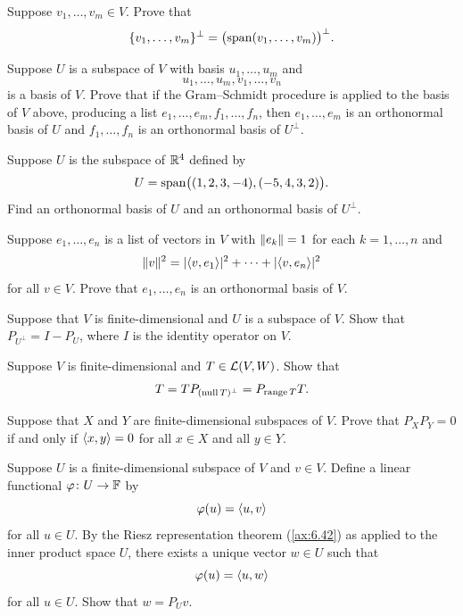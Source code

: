 \begin{exc}

\begin{exercise}
Suppose $v_1,\dots,v_m\in V$. Prove that
\[ \{v_1,\dots,v_m\}^\perp = \bigl(\operatorname{span}(v_1,\dots,v_m)\bigr)^\perp. \]
\end{exercise}

\begin{exercise}
Suppose $U$ is a subspace of $V$ with basis $u_1,\dots,u_m$ and
\[ u_1,\dots,u_m,v_1,\dots,v_n \]
is a basis of $V$. Prove that if the Gram--Schmidt procedure is applied to the
basis of $V$ above, producing a list $e_1,\dots,e_m,f_1,\dots,f_n$, then
$e_1,\dots,e_m$ is an orthonormal basis of $U$ and $f_1,\dots,f_n$ is an
orthonormal basis of $U^\perp$.
\end{exercise}

\begin{exercise}
Suppose $U$ is the subspace of $\mathbb{R}^4$ defined by
\[ U = \operatorname{span}\bigl((1,2,3,-4),(-5,4,3,2)\bigr). \]
Find an orthonormal basis of $U$ and an orthonormal basis of $U^\perp$.
\end{exercise}

\begin{exercise}
Suppose $e_1,\dots,e_n$ is a list of vectors in $V$ with $\lVert e_k \rVert=1$ for each
$k=1,\dots,n$ and
\[ \lVert v \rVert^2 = \lvert \langle v, e_1 \rangle \rvert^2+\cdots+\lvert \langle v, e_n \rangle \rvert^2 \]
for all $v\in V$. Prove that $e_1,\dots,e_n$ is an orthonormal basis of $V$.
\end{exercise}

\begin{exercise}
Suppose that $V$ is finite-dimensional and $U$ is a subspace of $V$. Show that
$P_{U^\perp}=I-P_U$, where $I$ is the identity operator on $V$.
\end{exercise}

\begin{exercise}
Suppose $V$ is finite-dimensional and $T\in\mathcal{L}(V,W)$. Show that
\[ T = TP_{(\operatorname{null} T)^\perp} = P_{\operatorname{range} T}T. \]
\end{exercise}

\begin{exercise}
Suppose that $X$ and $Y$ are finite-dimensional subspaces of $V$. Prove that
$P_XP_Y=0$ if and only if $\langle x, y \rangle=0$ for all $x\in X$ and all $y\in Y$.
\end{exercise}

\begin{exercise}
Suppose $U$ is a finite-dimensional subspace of $V$ and $v\in V$. Define a
linear functional $\varphi\colon U\to\mathbb{F}$ by
\[ \varphi(u) = \langle u, v \rangle \]
for all $u\in U$. By the Riesz representation theorem (\ref{ax:6.42}) as
applied to the inner product space $U$, there exists a unique vector $w\in U$
such that
\[ \varphi(u) = \langle u, w \rangle \]
for all $u\in U$. Show that $w=P_Uv$.
\end{exercise}


\end{exc}
